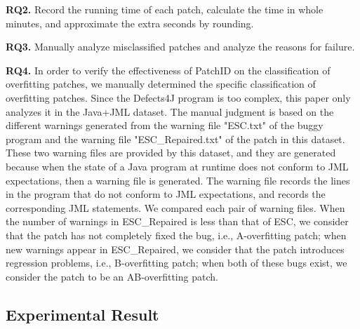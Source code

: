 \textbf{RQ2.} Record the running time of each patch, calculate the time in whole minutes, and approximate the extra seconds by rounding.

\textbf{RQ3.} Manually analyze misclassified patches and analyze the reasons for failure.

\textbf{RQ4.} In order to verify the effectiveness of PatchID on the classification of overfitting patches, we manually determined the specific classification of overfitting patches. Since the Defects4J program is too complex, this paper only analyzes it in the Java+JML dataset. The manual judgment is based on the different warnings generated from the warning file "ESC.txt" of the buggy program and the warning file "ESC\_Repaired.txt" of the patch in this dataset. These two warning files are provided by this dataset, and they are generated because when the state of a Java program at runtime does not conform to JML expectations, then a warning file is generated. The warning file records the lines in the program that do not conform to JML expectations, and records the corresponding JML statements. We compared each pair of warning files. When the number of warnings in ESC\_Repaired is less than that of ESC, we consider that the patch has not completely fixed the bug, i.e., A-overfitting patch; when new warnings appear in ESC\_Repaired, we consider that the patch introduces regression problems, i.e., B-overfitting patch; when both of these bugs exist, we consider the patch to be an AB-overfitting patch.

\subsection{Experimental Result}\label{5.3}
